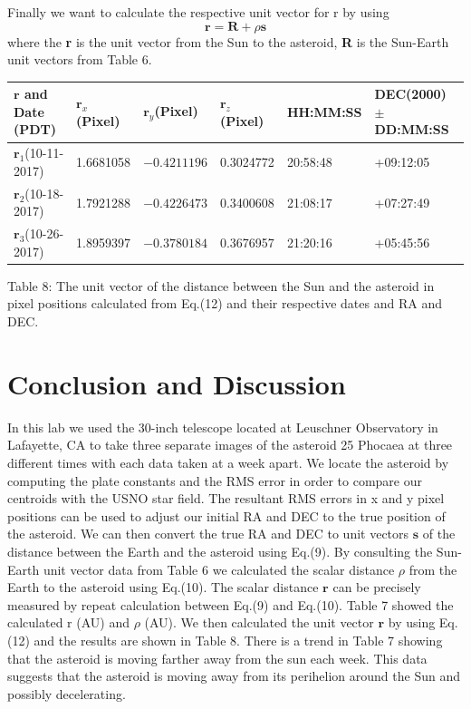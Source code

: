 \documentclass[onecolumn, 12pt, a4paper]{article}
\begin{document}
Finally we want to calculate the respective unit vector for r by using 
\newline
\begin{equation}
    \textbf{r} = \textbf{R} + \rho\textbf{s}
\end{equation}
where the \textbf{r} is the unit vector from the Sun to the asteroid, \textbf{R} is the Sun-Earth unit vectors from Table 6. \newline

\hspace*{-1.2cm}\begin{tabular}{ |p{2.5cm}|p{2.5cm}|p{2.5cm}|p{2.5cm}|p{2.3cm}|p{2.5cm}|}

 \hline
  $\textbf{r}$ and Date (PDT)& $\textbf{r}_x$(Pixel) & $\textbf{r}_y$(Pixel) & $\textbf{r}_z$(Pixel) & HH:MM:SS & DEC(2000) $\pm$DD:MM:SS\\
 \hline
 $\textbf{r}_1$(10-11-2017) & 1.6681058 & $-0.4211196$ & 0.3024772 & 20:58:48 & +09:12:05\\
 \hline
 $\textbf{r}_2$(10-18-2017)& 1.7921288 & $-0.4226473$  & 0.3400608 & 21:08:17 & +07:27:49 \\
 \hline
 $\textbf{r}_3$(10-26-2017)& 1.8959397 & $-0.3780184$ & 0.3676957 & 21:20:16 & +05:45:56 \\
 \hline
\end{tabular}
\leavevmode
\newline

Table 8: The unit vector of the distance between the Sun and the asteroid in pixel positions calculated from Eq.(12) and their respective dates and RA and DEC.
\newline
\section{Conclusion and Discussion}
In this lab we used the 30-inch telescope located at Leuschner Observatory in Lafayette, CA to take three separate images of the asteroid 25 Phocaea at three different times with each data taken at a week apart. We locate the asteroid by computing the plate constants and the RMS error in order to compare our centroids with the USNO star field. The resultant RMS errors in x and y pixel positions can be used to adjust our initial RA and DEC to the true position of the asteroid. We can then convert the true RA and DEC to unit vectors $\textbf{s}$ of the distance between the Earth and the asteroid using Eq.(9). By consulting the Sun-Earth unit vector data from Table 6 we calculated the scalar distance $\rho$ from the Earth to the asteroid using Eq.(10). The scalar distance $\textbf{r}$ can be precisely measured by repeat calculation between Eq.(9) and Eq.(10). Table 7 showed the calculated r (AU) and $\rho$ (AU). We then calculated the unit vector $\textbf{r}$ by using Eq.(12) and the results are shown in Table 8. There is a trend in Table 7 showing that the asteroid is moving farther away from the sun each week. This data suggests that the asteroid is moving away from its perihelion around the Sun and possibly decelerating. 
\end{document}
